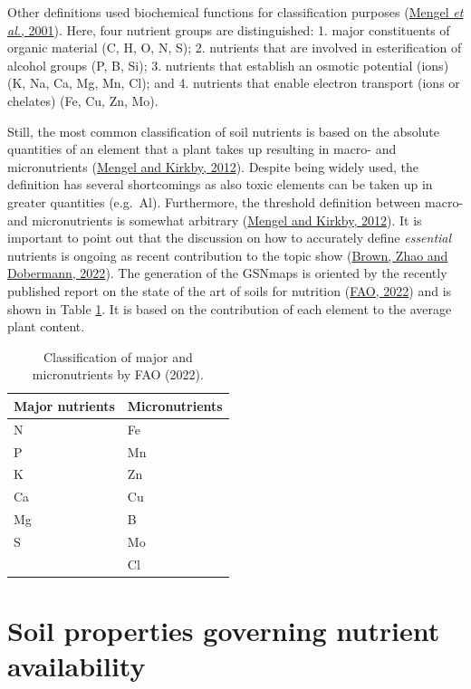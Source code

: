 \documentclass[
  10pt,
  b5paper,
  oneside]{book}
\begin{document}
Other definitions used biochemical functions for classification purposes (\protect\hyperlink{ref-mengel2001}{Mengel \emph{et al.}, 2001}). Here, four nutrient groups are distinguished:
1. major constituents of organic material (C, H, O, N, S);
2. nutrients that are involved in esterification of alcohol groups (P, B, Si);
3. nutrients that establish an osmotic potential (ions) (K, Na, Ca, Mg, Mn, Cl); and
4. nutrients that enable electron transport (ions or chelates) (Fe, Cu, Zn, Mo).

Still, the most common classification of soil nutrients is based on the absolute quantities of an element that a plant takes up resulting in macro- and micronutrients (\protect\hyperlink{ref-mengel2012}{Mengel and Kirkby, 2012}). Despite being widely used, the definition has several shortcomings as also toxic elements can be taken up in greater quantities (e.g.~Al). Furthermore, the threshold definition between macro- and micronutrients is somewhat arbitrary (\protect\hyperlink{ref-mengel2012}{Mengel and Kirkby, 2012}).
It is important to point out that the discussion on how to accurately define \emph{essential} nutrients is ongoing as recent contribution to the topic show (\protect\hyperlink{ref-brown2022}{Brown, Zhao and Dobermann, 2022}). The generation of the GSNmaps is oriented by the recently published report on the state of the art of soils for nutrition (\protect\hyperlink{ref-symposium2022}{FAO, 2022}) and is shown in Table \ref{tab:nutrients}. It is based on the contribution of each element to the average plant content.

\begin{table}

\caption{\label{tab:nutrients}Classification of major and micronutrients by FAO (2022).}
\centering
\begin{tabular}[t]{ll}
\toprule
Major nutrients & Micronutrients\\
\midrule
N & Fe\\
P & Mn\\
K & Zn\\
Ca & Cu\\
Mg & B\\
\addlinespace
S & Mo\\
 & Cl\\
\bottomrule
\end{tabular}
\end{table}

\hypertarget{soil-properties-governing-nutrient-availability}{%
\section{Soil properties governing nutrient availability}\label{soil-properties-governing-nutrient-availability}}
\end{document}

